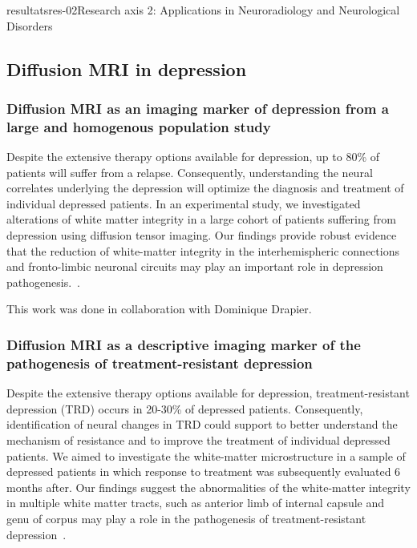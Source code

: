 \documentclass{ra2018}
\begin{document}
\begin{module}{resultats}{res-02}{Research axis 2: Applications in Neuroradiology and Neurological Disorders}
\subsection{Diffusion MRI in depression}
\subsubsection{Diffusion MRI as an imaging marker of depression from a large and homogenous population study}
\begin{participants}
\end{participants}
Despite the extensive therapy options available for depression, up to 80\% of patients will suffer from a relapse. Consequently, understanding the neural correlates underlying the depression will optimize the diagnosis and treatment of individual depressed patients. In an experimental study, we investigated alterations of white matter integrity in a large cohort of patients suffering from depression using diffusion tensor imaging. Our findings provide robust evidence that the reduction of white-matter integrity in the interhemispheric connections and fronto-limbic neuronal circuits may play an important role in depression pathogenesis.~\cite{coloigner:hal-01812093}. 

This work was done in collaboration with Dominique Drapier.

\subsubsection{Diffusion MRI as a descriptive imaging marker of the pathogenesis of treatment-resistant depression}
\begin{participants}
\end{participants}
Despite the extensive therapy options available for depression, treatment-resistant depression (TRD) occurs in 20-30\% of depressed patients. Consequently, identification of neural changes in TRD could support to better understand the mechanism of resistance and to improve the treatment of individual depressed patients. We aimed to investigate the white-matter microstructure in a sample of depressed patients in which response to treatment was subsequently evaluated 6 months after. Our findings suggest the abnormalities of the white-matter integrity in multiple white matter tracts, such as anterior limb of internal capsule and genu of corpus may play a role in the pathogenesis of treatment-resistant depression~\cite{coloigner:hal-01812087}.


\end{module}
\end{document}
